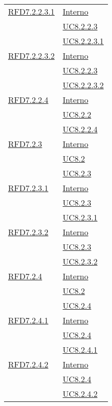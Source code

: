 \begin{longtable}{|>{\centering}m{5cm}|m{5cm}<{\centering}|}
\hyperlink{RFD7.2.2.3.1}{RFD7.2.2.3.1} & \hyperlink{Interno}{Interno}\\
& \hyperref[UC8.2.2.3]{UC8.2.2.3}\\
& \hyperref[UC8.2.2.3.1]{UC8.2.2.3.1}\\ \hline

\hyperlink{RFD7.2.2.3.2}{RFD7.2.2.3.2} & \hyperlink{Interno}{Interno}\\
& \hyperref[UC8.2.2.3]{UC8.2.2.3}\\
& \hyperref[UC8.2.2.3.2]{UC8.2.2.3.2}\\ \hline

\hyperlink{RFD7.2.2.4}{RFD7.2.2.4} & \hyperlink{Interno}{Interno}\\
& \hyperref[UC8.2.2]{UC8.2.2}\\
& \hyperref[UC8.2.2.4]{UC8.2.2.4}\\ \hline

\hyperlink{RFD7.2.3}{RFD7.2.3} & \hyperlink{Interno}{Interno}\\
& \hyperref[UC8.2]{UC8.2}\\
& \hyperref[UC8.2.3]{UC8.2.3}\\ \hline

\hyperlink{RFD7.2.3.1}{RFD7.2.3.1} & \hyperlink{Interno}{Interno}\\
& \hyperref[UC8.2.3]{UC8.2.3}\\
& \hyperref[UC8.2.3.1]{UC8.2.3.1}\\ \hline

\hyperlink{RFD7.2.3.2}{RFD7.2.3.2} & \hyperlink{Interno}{Interno}\\
& \hyperref[UC8.2.3]{UC8.2.3}\\
& \hyperref[UC8.2.3.2]{UC8.2.3.2}\\ \hline

\hyperlink{RFD7.2.4}{RFD7.2.4} & \hyperlink{Interno}{Interno}\\
& \hyperref[UC8.2]{UC8.2}\\
& \hyperref[UC8.2.4]{UC8.2.4}\\ \hline

\hyperlink{RFD7.2.4.1}{RFD7.2.4.1} & \hyperlink{Interno}{Interno}\\
& \hyperref[UC8.2.4]{UC8.2.4}\\
& \hyperref[UC8.2.4.1]{UC8.2.4.1}\\ \hline

\hyperlink{RFD7.2.4.2}{RFD7.2.4.2} & \hyperlink{Interno}{Interno}\\
& \hyperref[UC8.2.4]{UC8.2.4}\\
& \hyperref[UC8.2.4.2]{UC8.2.4.2}\\ \hline


\end{longtable}
